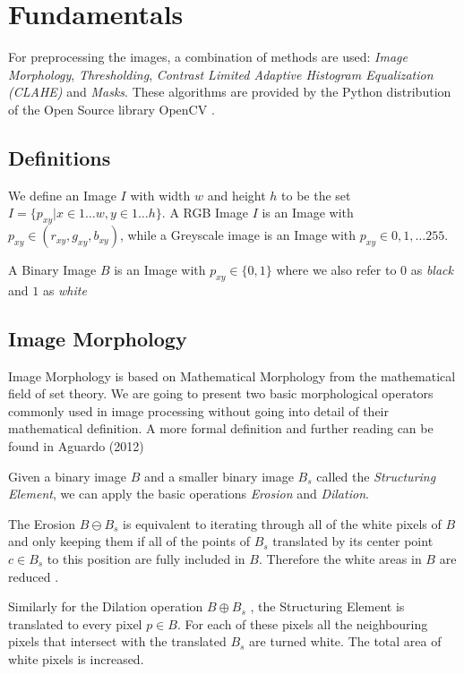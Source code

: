 
\section{Fundamentals}

For preprocessing the images, a combination of methods are used: \textit{Image
Morphology}, \textit{Thresholding}, \textit{Contrast Limited Adaptive Histogram
Equalization (CLAHE)} and \textit{Masks}. These algorithms are provided by the
Python distribution of the Open Source library OpenCV \cite{opencv_library}.

\subsection{Definitions}

We define an Image $I$ with width $w$ and height $h$ to be the set
$I = \{ p_{xy} | x \in 1 \dots w, y \in 1 \dots h \}$. A RGB Image $I$ is an
Image with $p_{xy} \in (r_{xy}, g_{xy}, b_{xy})$, while a Greyscale image is
an Image with $p_{xy} \in 0,1, \dots 255$.

A Binary Image $B$ is an Image with $p_{xy} \in \{0,1\}$ where we also refer to
$0$ as \textit{black} and $1$ as \textit{white}

\subsection{Image Morphology}

Image Morphology is based on Mathematical Morphology from the mathematical field
of set theory. We are going to present two basic morphological operators
commonly used in image processing without going into detail of their
mathematical definition. A more formal definition and further reading can be
found in Aguardo (2012) \cite{Aguardo2012}

Given a binary image $B$ and a smaller binary image $B_s$ called the
\textit{Structuring Element}, we can apply the basic operations \textit{Erosion}
and \textit{Dilation}.

The Erosion $B \ominus B_s$ is equivalent to iterating through all of the white
pixels of $B$ and only keeping them if all of the points of $B_s$ translated
by its center point $c \in B_s$ to this position are fully included in $B$.
Therefore the white areas in $B$ are reduced . \cite{Smith1997}

Similarly for the Dilation operation  $B \oplus B_s$ , the Structuring Element
is translated to every pixel $p \in B$. For each of these pixels all the
neighbouring pixels that intersect with the translated $B_s$ are turned white.
The total area of white pixels is increased. \cite{Smith1997}

